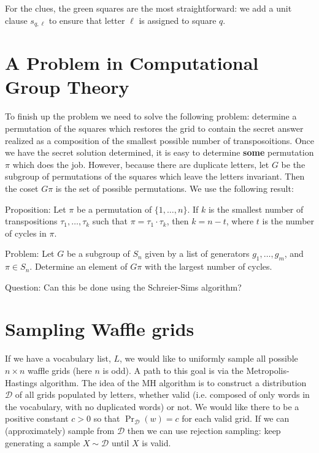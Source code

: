 \documentclass[11pt]{article}
\begin{document}
For the clues, the green squares are the most straightforward: we add
a unit clause \(s_{q,\ell}\) to ensure that letter \(\ell\) is assigned to
square \(q\).
\section{A Problem in Computational Group Theory}
\label{sec:org487875f}

To finish up the problem we need to solve the following problem:
determine a permutation of the squares which restores the grid to
contain the secret answer realized as a composition of the smallest
possible number of transposoitions.  Once we have the secret solution
determined, it is easy to determine \textbf{some} permutation \(\pi\) which
does the job.  However, because there are duplicate letters, let
\(G\) be the subgroup of permutations of the squares which leave the
letters invariant.  Then the coset \(G \pi\) is the set of possible
permutations.  We use the following result:

Proposition: Let \(\pi\) be a permutation of \(\{1, \dots, n\}\).  If \(k\)
is the smallest number of transpositions \(\tau_1, \dots, \tau_k\) such
that \(\pi = \tau_1 \cdot \tau_k\), then \(k = n - t\), where \(t\) is the
number of cycles in \(\pi\).

Problem: Let \(G\) be a subgroup of \(S_n\) given by a list of generators
\(g_1, \dots, g_m\), and \(\pi \in S_n\).  Determine an element of \(G \pi\)
with the largest number of cycles.

Question: Can this be done using the Schreier-Sims algorithm?
\section{Sampling Waffle grids}
\label{sec:org0f29621}

If we have a vocabulary list, \(L\), we would like to uniformly sample
all possible \(n \times n\) waffle grids (here \(n\) is odd).  A path to
this goal is via the Metropolis-Hastings algorithm.  The idea of the
MH algorithm is to construct a distribution \(\mathcal{D}\) of all grids
populated by letters, whether valid (i.e. composed of only words in
the vocabulary, with no duplicated words) or not.  We would like there
to be a positive constant \(c > 0\) so that \(\Pr_{\mathcal{D}}(w) = c\)
for each valid grid.  If we can (approximately) sample from
\(\mathcal{D}\) then we can use rejection sampling: keep generating a
sample \(X \sim \mathcal{D}\) until \(X\) is valid.
\end{document}
